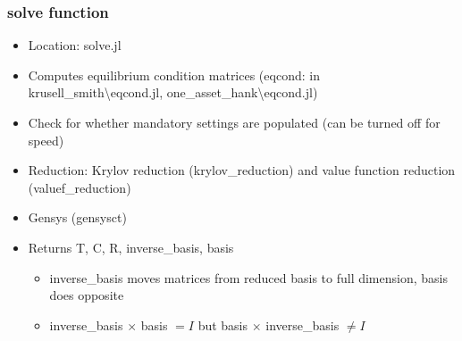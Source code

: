 \documentclass{beamer}
\begin{document}
\begin{frame}
  \frametitle{solve function}
\begin{itemize}
\item Location: solve.jl
\item Computes equilibrium condition matrices (eqcond: in krusell\_smith\textbackslash eqcond.jl, one\_asset\_hank\textbackslash eqcond.jl)
\item Check for whether mandatory settings are populated (can be turned off for speed)
\item Reduction: Krylov reduction (krylov\_reduction) and value function reduction (valuef\_reduction)
\item Gensys (gensysct)
\item Returns T, C, R, inverse\_basis, basis
\begin{itemize}
\item inverse\_basis moves matrices from reduced basis to full dimension, basis does opposite
\item inverse\_basis $\times$ basis $ = I$ but basis $\times$ inverse\_basis $\neq I$
\end{itemize}
\end{itemize}
\end{frame}
\end{document}

